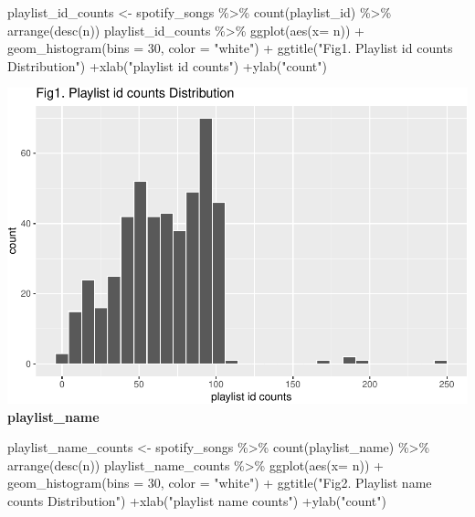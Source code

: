 \documentclass[
]{article}
\newenvironment{Shaded}{\begin{snugshade}}{\end{snugshade}}
\newcommand{\AttributeTok}[1]{\textcolor[rgb]{0.77,0.63,0.00}{#1}}
\newcommand{\DecValTok}[1]{\textcolor[rgb]{0.00,0.00,0.81}{#1}}
\newcommand{\FunctionTok}[1]{\textcolor[rgb]{0.00,0.00,0.00}{#1}}
\newcommand{\NormalTok}[1]{#1}
\newcommand{\OtherTok}[1]{\textcolor[rgb]{0.56,0.35,0.01}{#1}}
\newcommand{\SpecialCharTok}[1]{\textcolor[rgb]{0.00,0.00,0.00}{#1}}
\newcommand{\StringTok}[1]{\textcolor[rgb]{0.31,0.60,0.02}{#1}}
\begin{document}
\begin{Shaded}
\begin{Highlighting}[]
\NormalTok{playlist\_id\_counts }\OtherTok{\textless{}{-}}\NormalTok{ spotify\_songs }\SpecialCharTok{\%\textgreater{}\%}
  \FunctionTok{count}\NormalTok{(playlist\_id) }\SpecialCharTok{\%\textgreater{}\%}
  \FunctionTok{arrange}\NormalTok{(}\FunctionTok{desc}\NormalTok{(n))}
\NormalTok{playlist\_id\_counts }\SpecialCharTok{\%\textgreater{}\%} \FunctionTok{ggplot}\NormalTok{(}\FunctionTok{aes}\NormalTok{(}\AttributeTok{x=}\NormalTok{ n)) }\SpecialCharTok{+} \FunctionTok{geom\_histogram}\NormalTok{(}\AttributeTok{bins =} \DecValTok{30}\NormalTok{, }\AttributeTok{color =} \StringTok{"white"}\NormalTok{) }\SpecialCharTok{+}
  \FunctionTok{ggtitle}\NormalTok{(}\StringTok{"Fig1. Playlist id counts Distribution"}\NormalTok{) }\SpecialCharTok{+}\FunctionTok{xlab}\NormalTok{(}\StringTok{"playlist id counts"}\NormalTok{) }\SpecialCharTok{+}\FunctionTok{ylab}\NormalTok{(}\StringTok{"count"}\NormalTok{)}
\end{Highlighting}
\end{Shaded}

\includegraphics{Final-Report_files/figure-latex/unnamed-chunk-8-1.pdf}
\textbf{playlist\_name}

\begin{Shaded}
\begin{Highlighting}[]
\NormalTok{playlist\_name\_counts }\OtherTok{\textless{}{-}}\NormalTok{ spotify\_songs }\SpecialCharTok{\%\textgreater{}\%}
  \FunctionTok{count}\NormalTok{(playlist\_name) }\SpecialCharTok{\%\textgreater{}\%}
  \FunctionTok{arrange}\NormalTok{(}\FunctionTok{desc}\NormalTok{(n))}
\NormalTok{playlist\_name\_counts }\SpecialCharTok{\%\textgreater{}\%} \FunctionTok{ggplot}\NormalTok{(}\FunctionTok{aes}\NormalTok{(}\AttributeTok{x=}\NormalTok{ n)) }\SpecialCharTok{+} \FunctionTok{geom\_histogram}\NormalTok{(}\AttributeTok{bins =} \DecValTok{30}\NormalTok{, }\AttributeTok{color =} \StringTok{"white"}\NormalTok{) }\SpecialCharTok{+}
  \FunctionTok{ggtitle}\NormalTok{(}\StringTok{"Fig2. Playlist name counts Distribution"}\NormalTok{) }\SpecialCharTok{+}\FunctionTok{xlab}\NormalTok{(}\StringTok{"playlist name counts"}\NormalTok{) }\SpecialCharTok{+}\FunctionTok{ylab}\NormalTok{(}\StringTok{"count"}\NormalTok{)}
\end{Highlighting}
\end{Shaded}
\end{document}

